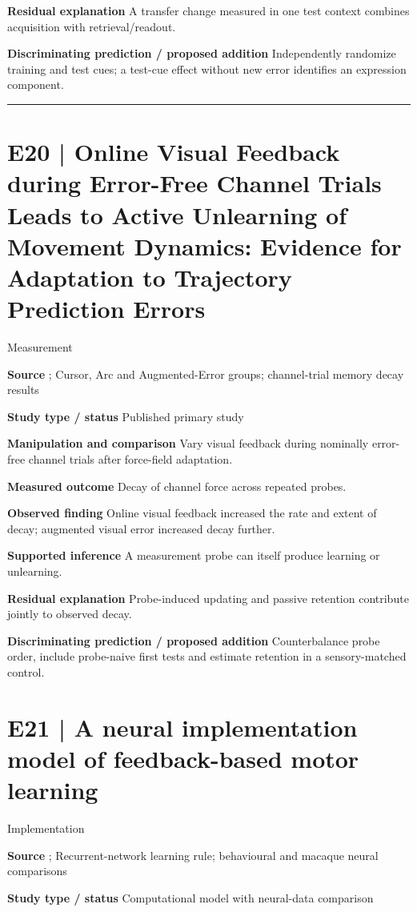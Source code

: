 \documentclass[11pt,a4paper]{article}
\begin{document}
\textbf{Residual explanation} A transfer change measured in one test context combines acquisition with retrieval/readout.\par
\textbf{Discriminating prediction / proposed addition} Independently randomize training and test cues; a test-cue effect without new error identifies an expression component.\par
\bigskip\hrule\medskip\section{E20 | Online Visual Feedback during Error-Free Channel Trials Leads to Active Unlearning of Movement Dynamics: Evidence for Adaptation to Trajectory Prediction Errors}
{\small\sffamily\color{navy} Measurement}\par
\textbf{Source} \cite{unlearning2016}; Cursor, Arc and Augmented-Error groups; channel-trial memory decay results\par
\textbf{Study type / status} Published primary study\par
\textbf{Manipulation and comparison} Vary visual feedback during nominally error-free channel trials after force-field adaptation.\par
\textbf{Measured outcome} Decay of channel force across repeated probes.\par
\textbf{Observed finding} Online visual feedback increased the rate and extent of decay; augmented visual error increased decay further.\par
\textbf{Supported inference} A measurement probe can itself produce learning or unlearning.\par
\textbf{Residual explanation} Probe-induced updating and passive retention contribute jointly to observed decay.\par
\textbf{Discriminating prediction / proposed addition} Counterbalance probe order, include probe-naive first tests and estimate retention in a sensory-matched control.\par
\clearpage\section{E21 | A neural implementation model of feedback-based motor learning}
{\small\sffamily\color{navy} Implementation}\par
\textbf{Source} \cite{feulner2025}; Recurrent-network learning rule; behavioural and macaque neural comparisons\par
\textbf{Study type / status} Computational model with neural-data comparison\par
\end{document}
